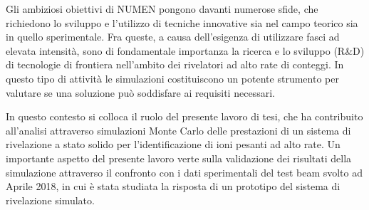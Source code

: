 Gli ambiziosi obiettivi di NUMEN pongono davanti numerose sfide, che richiedono lo sviluppo e l'utilizzo di tecniche innovative sia nel campo teorico sia in quello sperimentale. 
Fra queste, a causa dell'esigenza di utilizzare fasci ad elevata intensità, sono di fondamentale importanza la ricerca e lo sviluppo (R\&D) di tecnologie di frontiera nell'ambito dei rivelatori ad alto rate di conteggi.
In questo tipo di attività le simulazioni costituiscono un potente strumento per valutare se una soluzione può soddisfare ai requisiti necessari.

In questo contesto si colloca il ruolo del presente lavoro di tesi, che ha contribuito all'analisi attraverso simulazioni Monte Carlo delle prestazioni di un sistema di rivelazione a stato solido per l'identificazione di ioni pesanti ad alto rate.
Un importante aspetto del presente lavoro verte sulla validazione dei risultati della simulazione attraverso il confronto con i dati sperimentali del test beam svolto ad Aprile 2018, in cui è stata studiata la risposta di un prototipo del sistema di rivelazione simulato.


